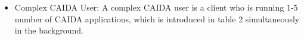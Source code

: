\begin{itemize}

    \item Complex CAIDA User: A complex CAIDA user is a \bc client who is running 1-5 number of CAIDA applications, which is introduced in table 2 simultaneously in the background. %
\end{itemize}    


